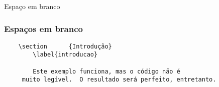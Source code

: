 \begin{frame}[standout]
  \Huge
  Espaço em branco
\end{frame}

\begin{frame}[fragile]
  \frametitle{Espaços em branco}
  \begin{verbatim}
    \section      {Introdução}
        \label{introducao}

        Este exemplo funciona, mas o código não é
     muito legível.  O resultado será perfeito, entretanto.
  \end{verbatim}
\end{frame}

\begin{frame}[standout]
  \Huge
\end{frame}

\begin{frame}[standout]
  \Huge
\end{frame}
